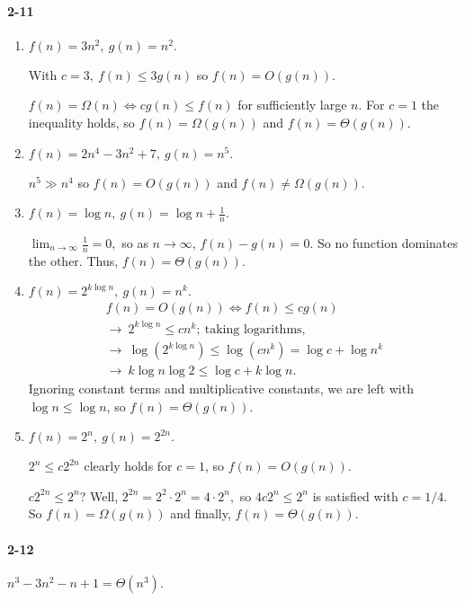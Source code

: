 \documentclass{report}
\begin{document}
\paragraph{2-11}
\begin{enumerate}[label=(\alph*)]
	\item $f(n) = 3n^2,\ g(n) = n^2.$

		With $c = 3,\ f(n) \le 3g(n)$ so $f(n) = O(g(n)).$

		$f(n) = \Omega(n) \Leftrightarrow cg(n) \le f(n)$ for sufficiently large $n$. For
		$c = 1$ the inequality holds, so $f(n) = \Omega(g(n))$ and $f(n) = \Theta(g(n)).$

	\item $f(n) = 2n^4 - 3n^2 + 7,\ g(n) = n^5.$
	
		$n^5 \gg n^4$ so $f(n) = O(g(n))$ and $f(n) \ne \Omega(g(n)).$

	\item $f(n) = \log n,\ g(n) = \log n + \frac{1}{n}.$

		$\lim_{n\rightarrow\infty} \frac{1}{n} = 0,$ so as $n\rightarrow\infty$,
		$f(n) - g(n) = 0$. So no function dominates the other. Thus, $f(n) = \Theta(g(n)).$

	\item $f(n) = 2^{k\log n},\ g(n) = n^k.$
		\begin{gather*}
			f(n) = O(g(n)) \Leftrightarrow f(n) \le cg(n) \\
			\rightarrow\ 2^{k\log n} \le cn^k;\ \text{taking logarithms,} \\
			\rightarrow\ \log\left(2^{k\log n}\right) \le \log\left(cn^k\right)
				= \log c + \log n^k \\
			\rightarrow\ k\log n\log 2 \le \log c + k\log n.
		\end{gather*}
		Ignoring constant terms and multiplicative constants, we are left with
		$\log n \le \log n$, so $f(n) = \Theta(g(n)).$

	\item $f(n) = 2^n,\ g(n) = 2^{2n}.$

		$2^n \le c2^{2n}$ clearly holds for $c = 1$, so $f(n) = O(g(n)).$

		$c2^{2n} \le 2^n$? Well, $2^{2n} = 2^2\cdot2^n = 4\cdot2^n,$ so
		$4c2^n \le 2^n$ is satisfied with $c = 1/4.$ So $f(n) = \Omega(g(n))$ and
		finally, $f(n) = \Theta(g(n)).$
\end{enumerate}

\paragraph{2-12}$n^3 - 3n^2 -n + 1 = \Theta(n^3).$
\end{document}
